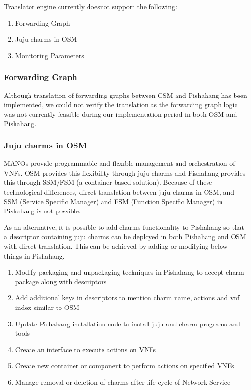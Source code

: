 Translator engine currently doesnot support the following:
\begin{enumerate}
	\item Forwarding Graph
	\item Juju charms in OSM
	\item Monitoring Parameters
\end{enumerate}

\subsubsection{Forwarding Graph}
Although translation of forwarding graphs between OSM and  Pishahang has been implemented, we could not verify the translation as the forwarding graph logic was not currently feasible during our implementation period in both OSM and Pishahang.

\subsubsection{Juju charms in OSM}
MANOs provide programmable and flexible management and orchestration of VNFs. OSM provides this flexibility through juju charms and Pishahang provides this through SSM/FSM (a container based solution). Because of these technological differences, direct translation between juju charms in OSM, and SSM (Service Specific Manager) and FSM (Function Specific Manager) in Pishahang is not possible. 

As an alternative, it is possible to add charms functionality to Pishahang so that a descriptor containing juju charms can be deployed in both Pishahang and OSM with direct translation. This can be achieved by adding or modifying below things in Pishahang.
\begin{enumerate}
	\item Modify packaging and unpackaging techniques in Pishahang to accept charm package along with descriptors
	\item Add additional keys in descriptors to mention charm name, actions and vnf index similar to OSM
	\item Update Pishahang installation code to install juju and charm programs and tools
	\item Create an interface to execute actions on VNFs
	\item Create new container or component to perform actions on specified VNFs
	\item Manage removal or deletion of charms after life cycle of Network Service 
\end{enumerate} 


